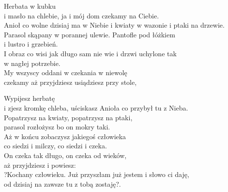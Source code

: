 \begin{text}
    Herbata w kubku\\
    i masło na chlebie, ja i mój dom czekamy na Ciebie.\\
    Anioł co wolne dzisiaj ma w Niebie i kwiaty w wazonie i ptaki na drzewie.\\
    Parasol skąpany w porannej ulewie. Pantofle pod łóżkiem\\
    i lustro i grzebień.\\
    I obraz co wisi jak długo sam nie wie i drzwi uchylone tak\\
    w nagłej potrzebie.\\
    My wszyscy oddani w czekania w niewolę\\
    czekamy aż przyjdziesz usiądziesz przy stole,

    Wypijesz herbatę\\
    i zjesz kromkę chleba, uściskasz Anioła co przybył tu z Nieba.\\
    Popatrzysz na kwiaty, popatrzysz na ptaki,\\
    parasol rozłożysz bo on mokry taki.\\
    Aż w końcu zobaczysz jakiegoś człowieka\\
    co siedzi i milczy, co siedzi i czeka.\\
    On czeka tak długo, on czeka od wieków,\\
    aż przyjdziesz i powiesz:\\
    ?Kochany człowieku. Już przyszłam już jestem i słowo ci daję,\\
    od dzisiaj na zawsze tu z tobą zostaję?.
\end{text}
\begin{chord}

\end{chord}